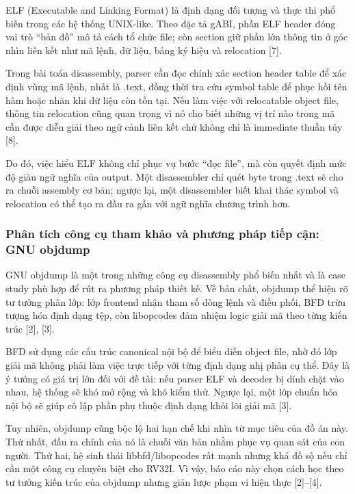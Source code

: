 \documentclass[
]{article}
\begin{document}
ELF (Executable and Linking Format) là định dạng đối tượng và thực thi
phổ biến trong các hệ thống UNIX-like. Theo đặc tả gABI, phần ELF header
đóng vai trò ``bản đồ'' mô tả cách tổ chức file; còn section giữ phần
lớn thông tin ở góc nhìn liên kết như mã lệnh, dữ liệu, bảng ký hiệu và
relocation {[}7{]}.

Trong bài toán disassembly, parser cần đọc chính xác section header
table để xác định vùng mã lệnh, nhất là .text, đồng thời tra cứu symbol
table để phục hồi tên hàm hoặc nhãn khi dữ liệu còn tồn tại. Nếu làm
việc với relocatable object file, thông tin relocation cũng quan trọng
vì nó cho biết những vị trí nào trong mã cần được diễn giải theo ngữ
cảnh liên kết chứ không chỉ là immediate thuần túy {[}8{]}.

Do đó, việc hiểu ELF không chỉ phục vụ bước ``đọc file'', mà còn quyết
định mức độ giàu ngữ nghĩa của output. Một disassembler chỉ quét byte
trong .text sẽ cho ra chuỗi assembly cơ bản; ngược lại, một disassembler
biết khai thác symbol và relocation có thể tạo ra đầu ra gần với ngữ
nghĩa chương trình hơn.

\hypertarget{phuxe2n-tuxedch-cuxf4ng-cux1ee5-tham-khux1ea3o-vuxe0-phux1b0ux1a1ng-phuxe1p-tiux1ebfp-cux1eadn-gnu-objdump}{%
\subsubsection{\texorpdfstring{ Phân tích công cụ tham khảo và phương
pháp tiếp cận: GNU
objdump}{ Phân tích công cụ tham khảo và phương pháp tiếp cận: GNU objdump}}\label{phuxe2n-tuxedch-cuxf4ng-cux1ee5-tham-khux1ea3o-vuxe0-phux1b0ux1a1ng-phuxe1p-tiux1ebfp-cux1eadn-gnu-objdump}}

GNU objdump là một trong những công cụ disassembly phổ biến nhất và là
case study phù hợp để rút ra phương pháp thiết kế. Về bản chất, objdump
thể hiện rõ tư tưởng phân lớp: lớp frontend nhận tham số dòng lệnh và
điều phối, BFD trừu tượng hóa định dạng tệp, còn libopcodes đảm nhiệm
logic giải mã theo từng kiến trúc {[}2{]}, {[}3{]}.

BFD sử dụng các cấu trúc canonical nội bộ để biểu diễn object file, nhờ
đó lớp giải mã không phải làm việc trực tiếp với từng định dạng nhị phân
cụ thể. Đây là ý tưởng có giá trị lớn đối với đề tài: nếu parser ELF và
decoder bị dính chặt vào nhau, hệ thống sẽ khó mở rộng và khó kiểm thử.
Ngược lại, một lớp chuẩn hóa nội bộ sẽ giúp cô lập phần phụ thuộc định
dạng khỏi lõi giải mã {[}3{]}.

Tuy nhiên, objdump cũng bộc lộ hai hạn chế khi nhìn từ mục tiêu của đồ
án này. Thứ nhất, đầu ra chính của nó là chuỗi văn bản nhằm phục vụ quan
sát của con người. Thứ hai, hệ sinh thái libbfd/libopcodes rất mạnh
nhưng khá đồ sộ nếu chỉ cần một công cụ chuyên biệt cho RV32I. Vì vậy,
báo cáo này chọn cách học theo tư tưởng kiến trúc của objdump nhưng giản
lược phạm vi hiện thực {[}2{]}--{[}4{]}.
\end{document}

